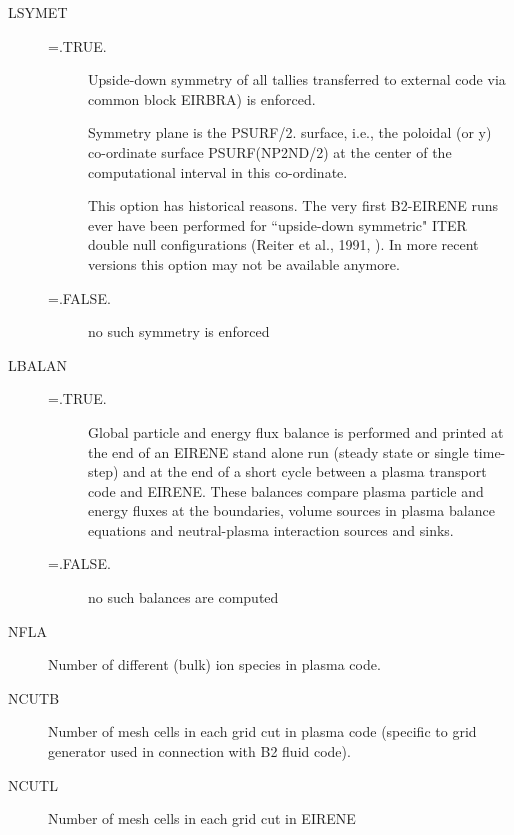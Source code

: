 \begin{description}
  \item[LSYMET]
        \begin{description}
          \item[=.TRUE.
                ]
                Upside-down symmetry of all tallies transferred to external
                code
                via common block EIRBRA) is enforced.

                Symmetry plane is the PSURF/2.
                surface, i.e., the
                poloidal (or y) co-ordinate surface
                PSURF(NP2ND/2) at the center of the computational
                interval in this co-ordinate.

                This option has historical reasons.
                The very first B2-EIRENE runs ever have been performed for ``upside-down
                symmetric" ITER double null configurations (Reiter et al., 1991,
                \cite{kn:Reiter91b}).
                In more recent versions this option may not be available anymore.

          \item[=.FALSE.
                ]
                no such symmetry is enforced
        \end{description}
  \item[LBALAN]
        \begin{description}
          \item[=.TRUE.
                ]
                Global particle and energy flux balance is performed and
                printed at
                the end of an EIRENE stand alone run (steady state or single
                time-step)
                and at the end of a short cycle between
                a plasma transport code and EIRENE.
                These balances compare plasma particle and energy fluxes at the boundaries,
                volume sources in plasma balance equations and neutral-plasma interaction
                sources and sinks.
          \item[=.FALSE.
                ]
                no such balances are computed
        \end{description}

  \item[NFLA] Number of different (bulk) ion species in plasma code.
  \item[NCUTB] Number of mesh cells in each grid cut in plasma code (specific to
        grid generator used in connection with B2 fluid code).
  \item[NCUTL] Number of mesh cells in each grid cut in EIRENE


\end{description}
